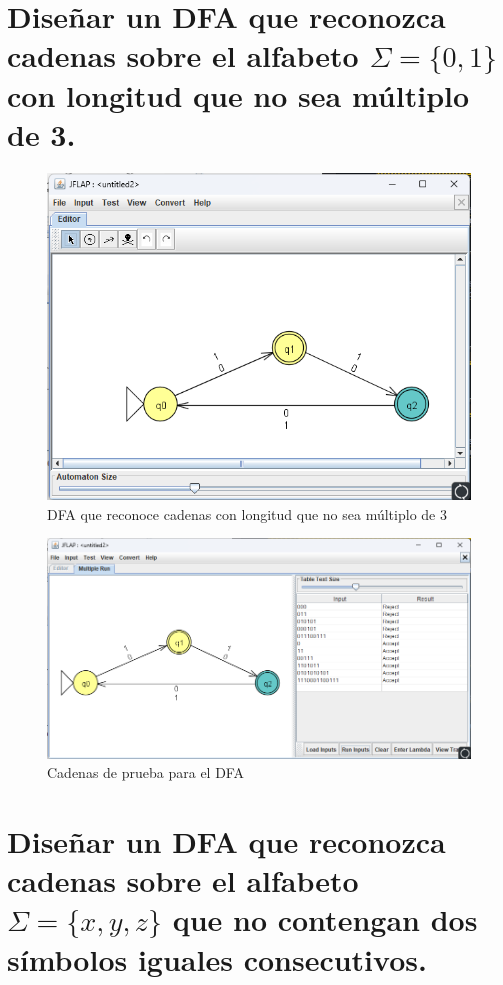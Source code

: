 \documentclass[11pt]{report}
\begin{document}
\newpage

\section{Diseñar un DFA que reconozca cadenas sobre el alfabeto $\Sigma = \{0, 1\}$ con longitud que no sea múltiplo de 3.}
\begin{figure}[H]
  \centering
  \includegraphics[scale=0.6]{img/DFA_09.png}
  \caption{DFA que reconoce cadenas con longitud que no sea múltiplo de 3}
\end{figure}

\begin{figure}[H]
  \centering
  \includegraphics[scale=0.65]{img/DFA_09_test.png}
  \caption{Cadenas de prueba para el DFA}
\end{figure}

\newpage

\section{Diseñar un DFA que reconozca cadenas sobre el alfabeto $\Sigma = \{x, y, z\}$ que no contengan dos símbolos iguales consecutivos.}
\end{document}
